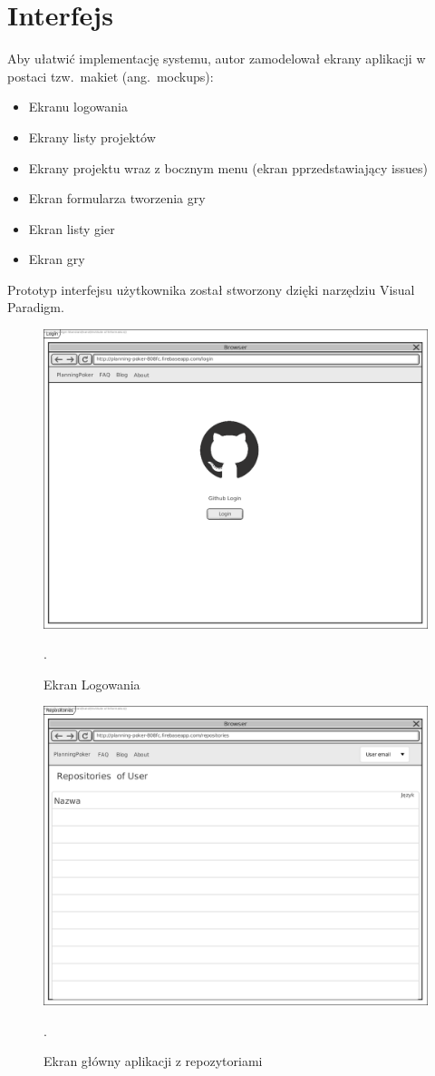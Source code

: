 \section{Interfejs}
Aby ułatwić implementację systemu, autor zamodelował ekrany aplikacji w postaci
tzw.\ makiet (ang.\ mockups):
\begin{itemize}
    \item Ekranu logowania
    \item Ekrany listy projektów
    \item Ekrany projektu wraz z bocznym menu (ekran pprzedstawiający issues)
    \item Ekran formularza tworzenia gry
    \item Ekran listy gier
    \item Ekran gry
\end{itemize}
Prototyp interfejsu użytkownika został stworzony dzięki narzędziu Visual Paradigm.
\begin{figure}[H]
	\centering\includegraphics[width=.7\textwidth]{img/LoginScreen.png}
	\caption{Ekran Logowania}.\label{rys:loginScreen}
\end{figure}
\begin{figure}[H]
	\centering\includegraphics[width=.7\textwidth]{img/RepositoriesScreen.png}
	\caption{Ekran główny aplikacji z repozytoriami}.\label{rys:RepositoriesScreen}
\end{figure}
